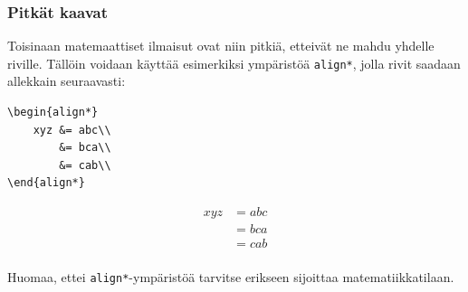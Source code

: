 \begin{frame}[fragile]
    \frametitle{Pitkät kaavat}
    Toisinaan matemaattiset ilmaisut ovat niin pitkiä, etteivät ne mahdu yhdelle riville. Tällöin voidaan käyttää esimerkiksi ympäristöä \verb-align*-, jolla rivit saadaan allekkain seuraavasti:

    \begin{minipage}{4cm}
        \begin{scriptsize}
            \begin{Verbatim}[frame=single]
\begin{align*}
    xyz &= abc\\
        &= bca\\
        &= cab\\
\end{align*}
            \end{Verbatim}
        \end{scriptsize}
    \end{minipage}
    \begin{minipage}{4cm}
        \begin{align*}
            xyz &= abc\\
                       &= bca\\
                              &= cab\\
        \end{align*}
    \end{minipage}

    Huomaa, ettei \verb-align*--ympäristöä tarvitse erikseen sijoittaa matematiikkatilaan.
\end{frame}
